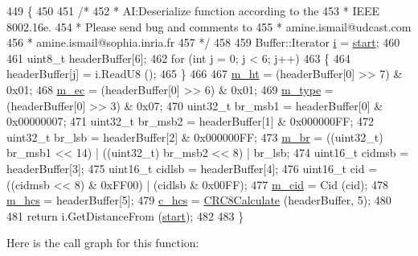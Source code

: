 \begin{DoxyCode}
449 \{
450 
451   \textcolor{comment}{/*}
452 \textcolor{comment}{   * AI:Deserialize function according to the}
453 \textcolor{comment}{   * IEEE 8002.16e.}
454 \textcolor{comment}{   * Please send bug and comments to}
455 \textcolor{comment}{   * amine.ismail@udcast.com}
456 \textcolor{comment}{   * amine.ismail@sophia.inria.fr}
457 \textcolor{comment}{   */}
458 
459   Buffer::Iterator \hyperlink{bernuolliDistribution_8m_a6f6ccfcf58b31cb6412107d9d5281426}{i} = \hyperlink{namespacevisualizer_1_1core_a2a35e5d8a34af358b508dac8635754e0}{start};
460 
461   uint8\_t headerBuffer[6];
462   \textcolor{keywordflow}{for} (\textcolor{keywordtype}{int} j = 0; j < 6; j++)
463     \{
464       headerBuffer[j] = i.ReadU8 ();
465     \}
466 
467   \hyperlink{classns3_1_1BandwidthRequestHeader_aa3c091baf3692d41a367aead455bbe8e}{m\_ht} = (headerBuffer[0] >> 7) & 0x01;
468   \hyperlink{classns3_1_1BandwidthRequestHeader_a015f61b40a1d73ed35d84a9cbe182e86}{m\_ec} = (headerBuffer[0] >> 6) & 0x01;
469   \hyperlink{classns3_1_1BandwidthRequestHeader_acbf2b6dc3bfefc47d08cf6edc673ec97}{m\_type} = (headerBuffer[0] >> 3) & 0x07;
470   uint32\_t br\_msb1 = headerBuffer[0] & 0x00000007;
471   uint32\_t br\_msb2 = headerBuffer[1] & 0x000000FF;
472   uint32\_t br\_lsb = headerBuffer[2] & 0x000000FF;
473   \hyperlink{classns3_1_1BandwidthRequestHeader_aaf45b47717a872f2cce8d64791d79cc6}{m\_br} = ((uint32\_t) br\_msb1 << 14) | ((uint32\_t) br\_msb2 << 8) | br\_lsb;
474   uint16\_t cidmsb = headerBuffer[3];
475   uint16\_t cidlsb = headerBuffer[4];
476   uint16\_t cid = ((cidmsb << 8) & 0xFF00) | (cidlsb & 0x00FF);
477   \hyperlink{classns3_1_1BandwidthRequestHeader_aea0cd9244c65e015ca03d4139d8cef62}{m\_cid} = Cid (cid);
478   \hyperlink{classns3_1_1BandwidthRequestHeader_a5d7b69f1290ad7762292a556d7f1687d}{m\_hcs} = headerBuffer[5];
479   \hyperlink{classns3_1_1BandwidthRequestHeader_a58a8219646d0c9055de4931cccdc0a95}{c\_hcs} = \hyperlink{namespacens3_a5329c9897a8f3f61ec901c9d1e61613a}{CRC8Calculate} (headerBuffer, 5);
480 
481   \textcolor{keywordflow}{return} i.GetDistanceFrom (\hyperlink{namespacevisualizer_1_1core_a2a35e5d8a34af358b508dac8635754e0}{start});
482 
483 \}
\end{DoxyCode}


Here is the call graph for this function\+:


